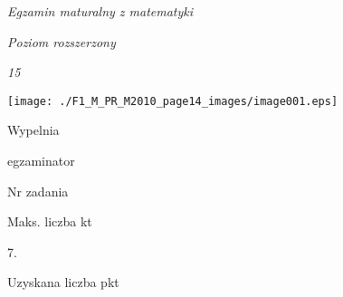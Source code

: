 \documentclass[a4paper,12pt]{article}
\begin{document}
{\it Egzamin maturalny z matematyki}

{\it Poziom rozszerzony}

{\it 15}
\begin{center}
\texttt{[image: ./F1\_M\_PR\_M2010\_page14\_images/image001.eps]}
\end{center}
Wypelnia

egzaminator

Nr zadania

Maks. liczba kt

7.

Uzyskana liczba pkt
\end{document}
